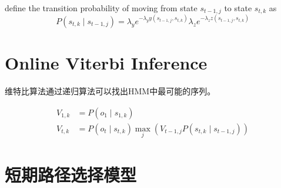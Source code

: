 define the transition probability of moving from state $ s_{t-1, j} $ to state $ s_{t, k} $ as
$$
P\left(s_{t, k} \mid s_{t-1, j}\right)=\lambda_{y} e^{-\lambda_{y} y\left(s_{t-1, j}, s_{t, k}\right)} \lambda_{z} e^{-\lambda_{z} z\left(s_{t-1, j}, s_{t, k}\right)}
$$

\section{Online Viterbi Inference}

维特比算法通过递归算法可以找出HMM中最可能的序列。

$$ \begin{aligned} V_{1, k} &=P\left(o_{1} \mid s_{1, k}\right) \\ V_{t, k} &=P\left(o_{t} \mid s_{t, k}\right) \max _{j}\left(V_{t-1, j} P\left(s_{t, k} \mid s_{t-1, j}\right)\right) \end{aligned} $$

\section{短期路径选择模型}